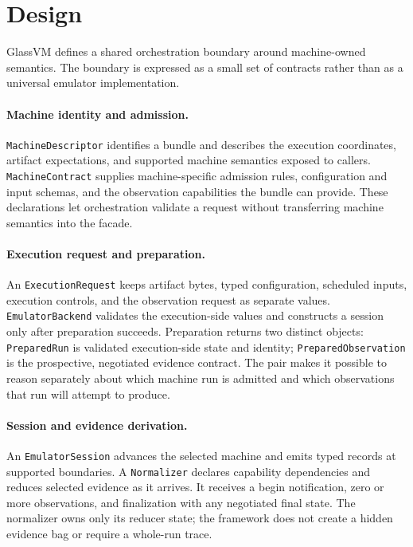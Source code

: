 \section{Design}

GlassVM defines a shared orchestration boundary around machine-owned
semantics. The boundary is expressed as a small set of contracts rather than
as a universal emulator implementation.

\paragraph{Machine identity and admission.}
\texttt{MachineDescriptor} identifies a bundle and describes the execution
coordinates, artifact expectations, and supported machine semantics exposed
to callers. \texttt{MachineContract} supplies machine-specific admission
rules, configuration and input schemas, and the observation capabilities the
bundle can provide. These declarations let orchestration validate a request
without transferring machine semantics into the facade.

\paragraph{Execution request and preparation.}
An \texttt{ExecutionRequest} keeps artifact bytes, typed configuration,
scheduled inputs, execution controls, and the observation request as separate
values. \texttt{EmulatorBackend} validates the execution-side values and
constructs a session only after preparation succeeds. Preparation returns
two distinct objects: \texttt{PreparedRun} is validated execution-side state
and identity; \texttt{PreparedObservation} is the prospective, negotiated
evidence contract. The pair makes it possible to reason separately about
which machine run is admitted and which observations that run will attempt to
produce.

\paragraph{Session and evidence derivation.}
An \texttt{EmulatorSession} advances the selected machine and emits typed
records at supported boundaries. A \texttt{Normalizer} declares capability
dependencies and reduces selected evidence as it arrives. It receives a
begin notification, zero or more observations, and finalization with any
negotiated final state. The normalizer owns only its reducer state; the
framework does not create a hidden evidence bag or require a whole-run trace.

